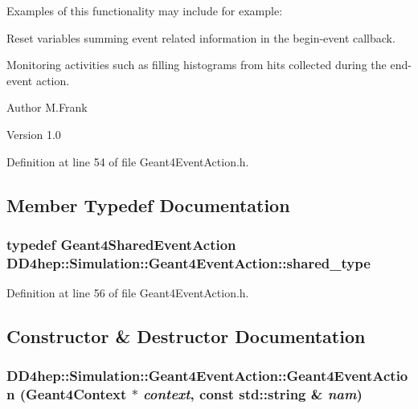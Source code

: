 Examples of this functionality may include for example:
\begin{DoxyItemize}
\item Reset variables summing event related information in the begin-\/event callback.
\item Monitoring activities such as filling histograms from hits collected during the end-\/event action.
\end{DoxyItemize}

\begin{DoxyAuthor}{Author}
M.Frank 
\end{DoxyAuthor}
\begin{DoxyVersion}{Version}
1.0 
\end{DoxyVersion}


Definition at line 54 of file Geant4EventAction.h.

\subsection{Member Typedef Documentation}
\hypertarget{class_d_d4hep_1_1_simulation_1_1_geant4_event_action_abef0506a1372b5723ccfb84ec11675e4}{
\subsubsection[{shared\_\-type}]{\setlength{\rightskip}{0pt plus 5cm}typedef {\bf Geant4SharedEventAction} {\bf DD4hep::Simulation::Geant4EventAction::shared\_\-type}}}
\label{class_d_d4hep_1_1_simulation_1_1_geant4_event_action_abef0506a1372b5723ccfb84ec11675e4}


Definition at line 56 of file Geant4EventAction.h.

\subsection{Constructor \& Destructor Documentation}
\hypertarget{class_d_d4hep_1_1_simulation_1_1_geant4_event_action_a334ced1ec29142af052446eb57c12dd1}{
\subsubsection[{Geant4EventAction}]{\setlength{\rightskip}{0pt plus 5cm}DD4hep::Simulation::Geant4EventAction::Geant4EventAction ({\bf Geant4Context} $\ast$ {\em context}, \/  const std::string \& {\em nam})}}
\label{class_d_d4hep_1_1_simulation_1_1_geant4_event_action_a334ced1ec29142af052446eb57c12dd1}


